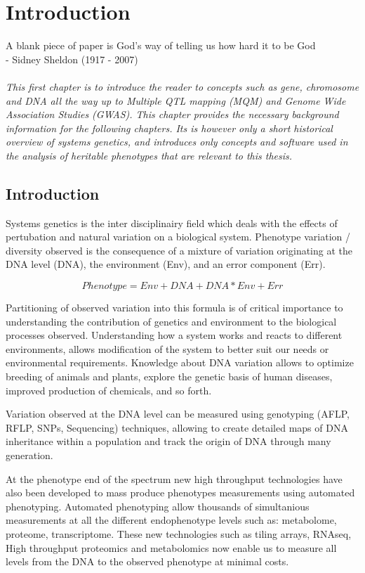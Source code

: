 \chapter{Introduction}

A blank piece of paper is God's way of telling us how hard it to be God\\
- Sidney Sheldon (1917 - 2007)\\\\

\emph{This first chapter is to introduce the reader to concepts such as gene, chromosome 
and DNA all the way up to Multiple QTL mapping (MQM) and Genome Wide Association Studies 
(GWAS). This chapter provides the necessary background information for the following 
chapters. Its is however only a short historical overview of systems genetics, and 
introduces only concepts and software used in the analysis of heritable phenotypes that 
are relevant to this thesis. }

\null
\vfill
\newpage

\section{Introduction}
Systems genetics is the inter disciplinairy field which deals with the effects of 
pertubation and natural variation on a biological system. Phenotype variation / 
diversity observed is the consequence of a mixture of variation originating at the 
DNA level (DNA), the environment (Env), and an error component (Err).

$$ Phenotype = Env + DNA + DNA * Env + Err $$

Partitioning of observed variation into this formula is of critical importance 
to understanding the contribution of genetics and environment to the biological 
processes observed. Understanding how a system works and reacts to different 
environments, allows modification of the system to better suit our needs or 
environmental requirements. Knowledge about DNA variation allows to optimize 
breeding of animals and plants, explore the genetic basis of human diseases, 
improved production of chemicals, and so forth.

Variation observed at the DNA level can be measured using genotyping (AFLP, RFLP, 
SNPs, Sequencing) techniques, allowing to create detailed maps of DNA inheritance 
within a population and track the origin of DNA through many generation.

At the phenotype end of the spectrum new high throughput technologies have also 
been developed to mass produce phenotypes measurements using automated phenotyping. 
Automated phenotyping allow thousands of simultanious measurements at all the 
different endophenotype levels such as: metabolome, proteome, transcriptome. These 
new technologies such as tiling arrays, RNAseq, High throughput proteomics and 
metabolomics now enable us to measure all levels from the DNA to the observed 
phenotype at minimal costs.

